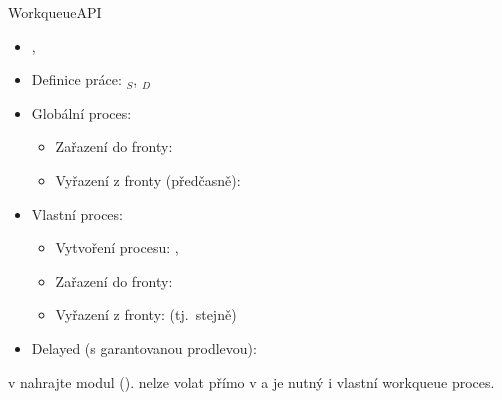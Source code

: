 \begin{frame}{Workqueue}{API}

  \begin{itemize}
    \item {}, 
    \item Definice práce: $_S$, $_D$

    \pause

    \item Globální proces:
    \begin{itemize}
      \item Zařazení do fronty: 
      \item Vyřazení z fronty (předčasně): 
    \end{itemize}

    \pause

    \item Vlastní proces:
    \begin{itemize}
      \item Vytvoření procesu: ,
      \item Zařazení do fronty: 
      \item Vyřazení z fronty:  (tj.\ stejně)
    \end{itemize}

    \pause

    \item Delayed (s garantovanou prodlevou): 
  \end{itemize}

  \pause
  \medskip

   v  nahrajte modul 
  ().  nelze volat přímo v
   a je nutný i vlastní workqueue proces.

\end{frame}

